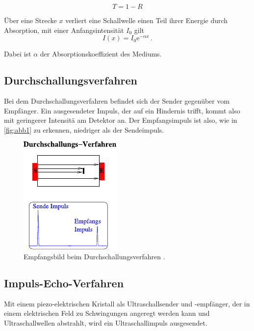 \begin{equation}
    T = 1 - R
    \label{eq:transmisskoeff}
\end{equation}


Über eine Strecke $x$ verliert eine Schallwelle einen Teil ihrer
Energie durch Absorption, mit einer Anfangsintensität $I_0$ gilt
\begin{equation}
    I(x) = I_0 \mathrm{e}^{-\alpha x} \,.
\end{equation}

Dabei ist $\alpha$ der Absorptionskoeffizient des Mediums.

\subsection{Durchschallungsverfahren}

Bei dem Durchschallungsverfahren befindet sich der Sender gegenüber
vom Empfänger.
Ein ausgesendeter Impuls, der auf ein Hindernis trifft, kommt
also mit geringerer Intensitä am Detektor an.
Der Empfangsimpuls ist also, wie in \autoref{fig:abb1} zu erkennen,
niedriger als der Sendeimpuls.

\begin{figure}
    \centering
    \includegraphics{figures/abb1.pdf}
    \caption{Empfangsbild beim Durchschallungsverfahren \cite{ap06}.}
    \label{fig:abb1}
\end{figure}

\subsection{Impuls-Echo-Verfahren}

Mit einem piezo-elektrischen Kristall als Ultraschallsender und
-empfänger, der in einem elektrischen Feld zu Schwingungen
angeregt werden kann und Ultraschallwellen abstrahlt, wird ein
Ultraschallimpuls ausgesendet. \\

